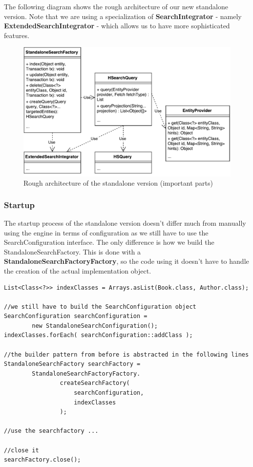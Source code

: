 \noindent
The following diagram shows the rough architecture of our new standalone version. Note that we are using a specialization of \textbf{SearchIntegrator} - namely \textbf{ExtendedSearchIntegrator} - which allows us to have more sophisticated features.
\\
\begin{figure}[ht]
	\centering
	\includegraphics[scale=0.6]{images/standalone_min_architecture.pdf}
	\caption{Rough architecture of the standalone version (important parts)}
	\label{standalone_min_architecture}
\end{figure}

\pagebreak

\subsubsection{Startup}

The startup process of the standalone version doesn't differ much from manually using the engine in terms of configuration as we still have to use the SearchConfiguration interface. The only difference is how we build the StandaloneSearchFactory. This is done with a \textbf{StandaloneSearchFactoryFactory}, so the code using it doesn't have to handle the creation of the actual implementation object.
\\
\lstset{language=java}
\begin{lstlisting}[frame=htrbl, caption={Starting up the standalone version}, label={lst:using_standalone.java}]
List<Class<?>> indexClasses = Arrays.asList(Book.class, Author.class);

//we still have to build the SearchConfiguration object
SearchConfiguration searchConfiguration = 
		new StandaloneSearchConfiguration();
indexClasses.forEach( searchConfiguration::addClass );

//the builder pattern from before is abstracted in the following lines
StandaloneSearchFactory searchFactory = 
		StandaloneSearchFactoryFactory.
				createSearchFactory(
					searchConfiguration,
					indexClasses
				);
				
//use the searchfactory ...

//close it
searchFactory.close();
\end{lstlisting}

